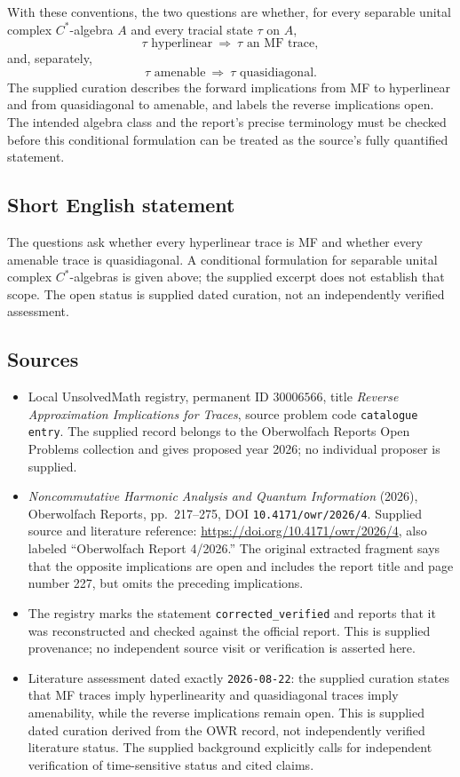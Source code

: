 \documentclass[11pt]{article}
\begin{document}
With these conventions, the two questions are whether, for every separable unital complex \(C^*\)-algebra \(A\) and every tracial state \(\tau\) on \(A\),
\[
\tau\text{ hyperlinear}\ \Longrightarrow\ \tau\text{ an MF trace},
\]
and, separately,
\[
\tau\text{ amenable}\ \Longrightarrow\ \tau\text{ quasidiagonal}.
\]
The supplied curation describes the forward implications from MF to hyperlinear and from quasidiagonal to amenable, and labels the reverse implications open. The intended algebra class and the report's precise terminology must be checked before this conditional formulation can be treated as the source's fully quantified statement.
\subsection{Short English statement}
The questions ask whether every hyperlinear trace is MF and whether every amenable trace is quasidiagonal. A conditional formulation for separable unital complex \(C^*\)-algebras is given above; the supplied excerpt does not establish that scope. The open status is supplied dated curation, not an independently verified assessment.
\subsection{Sources}
\begin{itemize}
\item Local UnsolvedMath registry, permanent ID \(30006566\), title \emph{Reverse Approximation Implications for Traces}, source problem code \texttt{catalogue entry}. The supplied record belongs to the Oberwolfach Reports Open Problems collection and gives proposed year 2026; no individual proposer is supplied.
\item \emph{Noncommutative Harmonic Analysis and Quantum Information} (2026), Oberwolfach Reports, pp.\ 217--275, DOI \texttt{10.4171/owr/2026/4}. Supplied source and literature reference: \url{https://doi.org/10.4171/owr/2026/4}, also labeled ``Oberwolfach Report 4/2026.'' The original extracted fragment says that the opposite implications are open and includes the report title and page number 227, but omits the preceding implications.
\item The registry marks the statement \texttt{corrected\_verified} and reports that it was reconstructed and checked against the official report. This is supplied provenance; no independent source visit or verification is asserted here.
\item Literature assessment dated exactly \texttt{2026-08-22}: the supplied curation states that MF traces imply hyperlinearity and quasidiagonal traces imply amenability, while the reverse implications remain open. This is supplied dated curation derived from the OWR record, not independently verified literature status. The supplied background explicitly calls for independent verification of time-sensitive status and cited claims.
\end{itemize}
\end{document}

